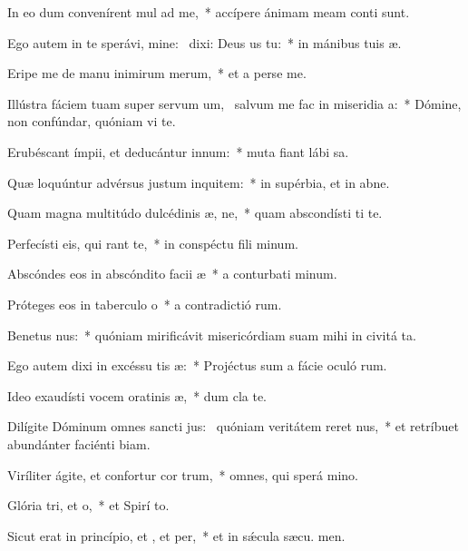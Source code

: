 \item In eo dum convenírent mul ad me,~* accípere ánimam meam conti sunt.
\item Ego autem in te sperávi, mine:~\pscross{} dixi: Deus us  tu:~* in mánibus tuis  æ.
\item Eripe me de manu inimirum merum,~* et a perse me.
\item Illústra fáciem tuam super servum um,~\pscross{} salvum me fac in miseridia a:~* Dómine, non confúndar, quóniam vi te.
\item Erubéscant ímpii, et deducántur  innum:~* muta fiant lábi sa.
\item Quæ loquúntur advérsus justum inquitem:~* in supérbia, et in abne.
\item Quam magna multitúdo dulcédinis æ, ne,~* quam abscondísti ti te.
\item Perfecísti eis, qui rant  te,~* in conspéctu fili minum.
\item Abscóndes eos in abscóndito facii æ~* a conturbati minum.
\item Próteges eos in taberculo o~* a contradictió rum.
\item Benetus nus:~* quóniam mirificávit misericórdiam suam mihi in civitá ta.
\item Ego autem dixi in excéssu tis æ:~* Projéctus sum a fácie oculó rum.
\item Ideo exaudísti vocem oratinis æ,~* dum cla  te.
\item Dilígite Dóminum omnes sancti jus:~\pscross{} quóniam veritátem reret nus,~* et retríbuet abundánter faciénti biam.
\item Viríliter ágite, et confortur cor trum,~* omnes, qui sperá  mino.
\item Glória tri, et o,~* et Spirí to.
\item Sicut erat in princípio, et , et per,~* et in sǽcula sæcu. men.
